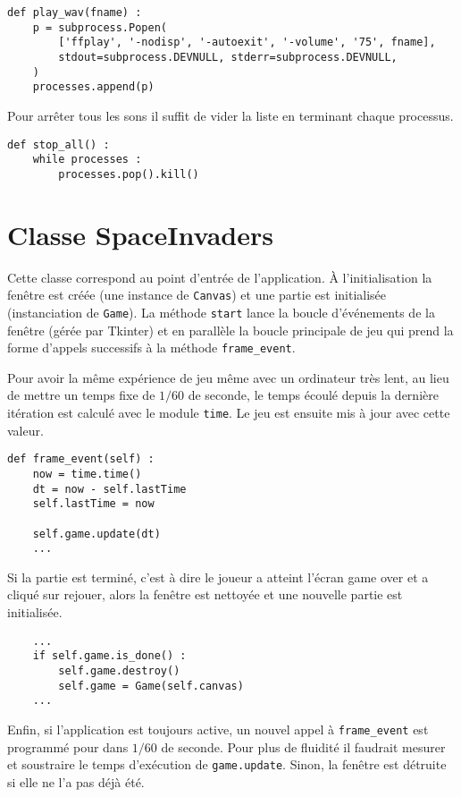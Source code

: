 \documentclass[12pt]{article}
\newcommand{\pagesection}{\newpage\section}
\begin{document}
\begin{verbatim}
def play_wav(fname) :
	p = subprocess.Popen(
		['ffplay', '-nodisp', '-autoexit', '-volume', '75', fname],
		stdout=subprocess.DEVNULL, stderr=subprocess.DEVNULL,
	)
	processes.append(p)
\end{verbatim}

Pour arrêter tous les sons il suffit de vider la liste en terminant chaque processus.
\begin{verbatim}
def stop_all() :
	while processes :
		processes.pop().kill()
\end{verbatim}



\pagesection{Classe SpaceInvaders}
Cette classe correspond au point d'entrée de l'application. À l'initialisation la fenêtre est créée (une instance de \texttt{Canvas}) et une partie est initialisée (instanciation de \texttt{Game}). La méthode \texttt{start} lance la boucle d'événements de la fenêtre (gérée par Tkinter) et en parallèle la boucle principale de jeu qui prend la forme d'appels successifs à la méthode \texttt{frame\_event}.


\par Pour avoir la même expérience de jeu même avec un ordinateur très lent, au lieu de mettre un temps fixe de $1/60$ de seconde, le temps écoulé depuis la dernière itération est calculé avec le module \texttt{time}. Le jeu est ensuite mis à jour avec cette valeur.

\begin{verbatim}
def frame_event(self) :
	now = time.time()
	dt = now - self.lastTime
	self.lastTime = now

	self.game.update(dt)
	...
\end{verbatim}

Si la partie est terminé, c'est à dire le joueur a atteint l'écran game over et a cliqué sur rejouer, alors la fenêtre est nettoyée et une nouvelle partie est initialisée.

\begin{verbatim}
	...
	if self.game.is_done() :
		self.game.destroy()
		self.game = Game(self.canvas)
	...
\end{verbatim}


Enfin, si l'application est toujours active, un nouvel appel à \texttt{frame\_event} est programmé pour dans $1/60$ de seconde. Pour plus de fluidité il faudrait mesurer et soustraire le temps d'exécution de \texttt{game.update}. Sinon, la fenêtre est détruite si elle ne l'a pas déjà été.
\end{document}
